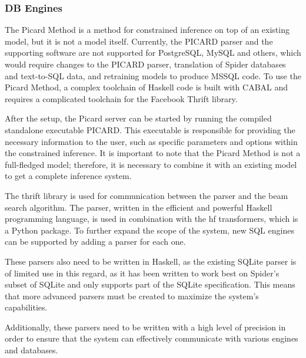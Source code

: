 \subsubsection*{DB Engines}

The Picard Method is a method for constrained inference on top of an existing model, but it is not a model itself. Currently, the PICARD parser and the supporting software are not supported for PostgreSQL, MySQL and others, which would require changes to the PICARD parser, translation of Spider databases and text-to-SQL data, and retraining models to produce MSSQL code. To use the Picard Method, a complex toolchain of Haskell code is built with CABAL and requires a complicated toolchain for the Facebook Thrift library.

After the setup, the Picard server can be started by running the compiled standalone executable PICARD. This executable is responsible for providing the necessary information to the user, such as specific parameters and options within the constrained inference. It is important to note that the Picard Method is not a full-fledged model; therefore, it is necessary to combine it with an existing model to get a complete inference system.

The thrift library is used for communication between the parser and the beam search algorithm. The parser, written in the efficient and powerful Haskell programming language, is used in combination with the hf transformers, which is a Python package. To further expand the scope of the system, new SQL engines can be supported by adding a parser for each one.

These parsers also need to be written in Haskell, as the existing SQLite parser is of limited use in this regard, as it has been written to work best on Spider's subset of SQLite and only supports part of the SQLite specification. This means that more advanced parsers must be created to maximize the system's capabilities.

Additionally, these parsers need to be written with a high level of precision in order to ensure that the system can effectively communicate with various engines and databases.
